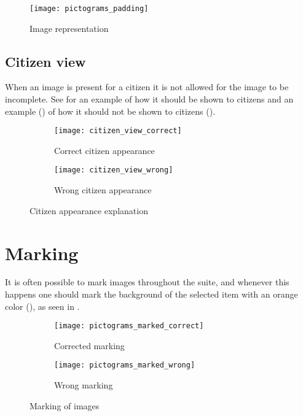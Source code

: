 \begin{figure}[h]
	\centering
	\texttt{[image: pictograms\_padding]}
	\caption{Image representation}
	\label{fig:pictograms_padding}
\end{figure} 
\FloatBarrier

\subsection{Citizen view}
\label{sub:citizen_view}

When an image is present for a citizen it is not allowed for the image to be incomplete. See  for an example of how it should be shown to citizens and an example () of how it should not be shown to citizens (). 

\begin{figure}[!htbp]
    \centering

    \begin{subfigure}[t]{0.4\textwidth}
        \centering
        \texttt{[image: citizen\_view\_correct]}
        \caption{Correct citizen appearance}
        \label{fig:citizen_image_view_correct}
    \end{subfigure}
    \hspace{5em} 
    \begin{subfigure}[t]{0.4\textwidth}
        \centering
        \texttt{[image: citizen\_view\_wrong]}
        \caption{Wrong citizen appearance}
        \label{fig:citizen_image_view_wrong}
    \end{subfigure}
    
    \caption{Citizen appearance explanation}
    \label{fig:citizen_image_view}
\end{figure}

\section{Marking}
\label{sec:marking}
It is often possible to mark images throughout the suite, and whenever this happens one should mark the background of the selected item with an orange color (), as seen in . 

\begin{figure}[!htbp]
    \centering

    \begin{subfigure}[t]{0.4\textwidth}
    	\centering
        \texttt{[image: pictograms\_marked\_correct]}
        \caption{Corrected marking}
        \label{fig:pictograms_marked_corect}
    \end{subfigure}
    \hspace{5em} 
    \begin{subfigure}[t]{0.4\textwidth}
    	\centering
        \texttt{[image: pictograms\_marked\_wrong]}
        \caption{Wrong marking}
        \label{fig:pictograms_marked_wrong}
    \end{subfigure}
    
    \caption{Marking of images}
    \label{fig:pictograms_marked}
\end{figure}

